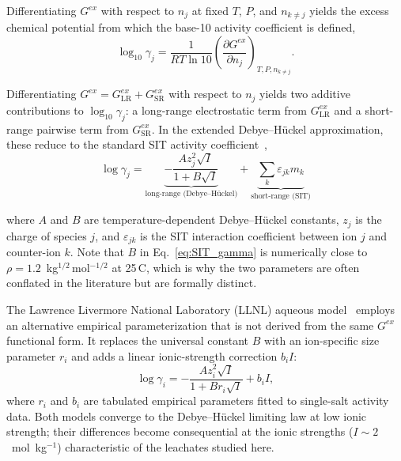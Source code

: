 \documentclass[final,2p,times]{elsarticle}
\begin{document}
Differentiating $G^{ex}$ with respect to $n_j$ at fixed $T$, $P$, and $n_{k\neq j}$ yields the excess chemical potential from which the base-10 activity coefficient is defined,
\begin{equation}
\log_{10} \gamma_j =
\frac{1}{RT\ln 10}
\left( \frac{\partial G^{ex}}{\partial n_j} \right)_{T,P,n_{k \neq j}}.
\label{eq:gamma_def}
\end{equation}

\noindent
Differentiating $G^{ex} = G^{ex}_{\text{LR}} + G^{ex}_{\text{SR}}$ with respect to $n_j$ yields two additive contributions to $\log_{10}\gamma_j$: a long-range electrostatic term from $G^{ex}_{\text{LR}}$ and a short-range pairwise term from $G^{ex}_{\text{SR}}$. In the extended Debye--H\"uckel approximation, these reduce to the standard SIT activity coefficient~\cite{guggenheim_specific_1955,ciavatta_ionic_1980},
\begin{equation}
\log \gamma_j
=
\underbrace{-\frac{A z_j^2 \sqrt{I}}{1 + B \sqrt{I}}}_{\text{long-range (Debye--H\"uckel)}}
+
\underbrace{\sum_k \varepsilon_{jk} m_k}_{\text{short-range (SIT)}}
\label{eq:SIT_gamma}
\end{equation}

\noindent
where $A$ and $B$ are temperature-dependent Debye--H\"uckel constants, $z_j$ is the charge of species $j$, and $\varepsilon_{jk}$ is the SIT interaction coefficient between ion $j$ and counter-ion $k$. Note that $B$ in Eq.~\ref{eq:SIT_gamma} is numerically close to $\rho = 1.2$~kg$^{1/2}$\,mol$^{-1/2}$ at 25\,\textdegree C, which is why the two parameters are often conflated in the literature but are formally distinct.

The Lawrence Livermore National Laboratory (LLNL) aqueous model~\cite{wolery_eq6_1992} employs an alternative empirical parameterization that is not derived from the same $G^{ex}$ functional form. It replaces the universal constant $B$ with an ion-specific size parameter $r_i$ and adds a linear ionic-strength correction $b_i I$:
\begin{equation}
\log \gamma_i =
- \frac{A z_i^2 \sqrt{I}}{1 + B r_i \sqrt{I}}
+ b_i I,
\label{eq:LLNL_gamma}
\end{equation}
\noindent
where $r_i$ and $b_i$ are tabulated empirical parameters fitted to single-salt activity data. Both models converge to the Debye--H\"uckel limiting law at low ionic strength; their differences become consequential at the ionic strengths ($I \sim 2$~mol~kg$^{-1}$) characteristic of the leachates studied here.
\end{document}

